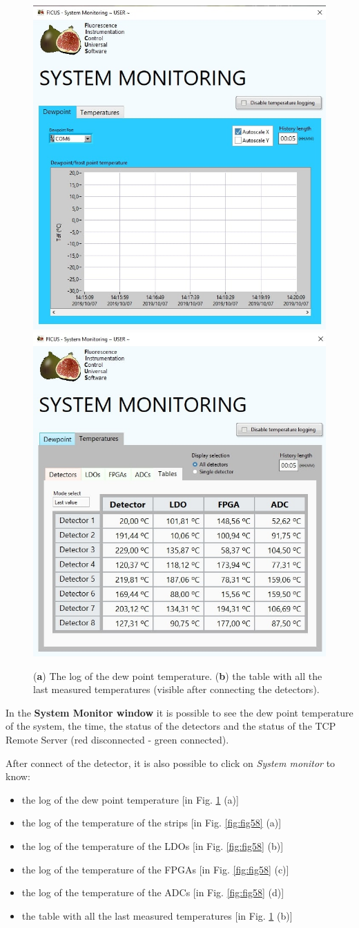 \documentclass[a4paper,12pt,oneside,pdflatex,italian,final,twocolumn]{article}
\begin{document}
\begin{figure}[h]
\centering
\subfloat
{\includegraphics[width=.45\textwidth]{Cattura106.jpg}} \quad
\subfloat
{\includegraphics[width=.45\textwidth]{Cattura111.jpg}} \\
\caption{(\textbf{a}) The log of the dew point temperature. (\textbf{b}) the table with all the last measured temperatures (visible after connecting the detectors).}\label{fig:fig57}
\end{figure}

In the \textbf{System Monitor window} it is possible to see the dew point temperature of the system, the time, the status of the detectors and the status of the TCP Remote Server (red disconnected - green connected). 


After connect of the detector, it is also possible to click on \textit{System monitor} to know: 
\begin{itemize}
    \item the log of the dew point temperature [in Fig. \ref{fig:fig57} (a)]
    \item the log of the temperature of the strips [in Fig. \ref{fig:fig58} (a)]
    \item the log of the temperature of the LDOs [in Fig. \ref{fig:fig58} (b)]
    \item the log of the temperature of the FPGAs [in Fig. \ref{fig:fig58} (c)]
    \item the log of the temperature of the ADCs [in Fig. \ref{fig:fig58} (d)]
    \item the table with all the last measured temperatures [in Fig. \ref{fig:fig57} (b)]
\end{itemize}
\end{document}
